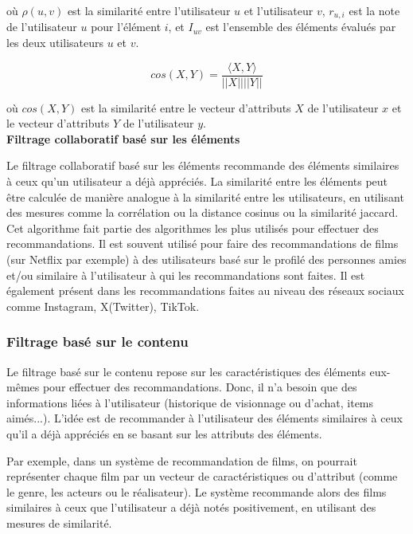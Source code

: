 \documentclass[11pt]{article}
\begin{document}
où $\rho(u, v)$ est la similarité entre l'utilisateur $u$ et l'utilisateur $v$, $r_{u,i}$ est la note de l'utilisateur $u$ pour l'élément $i$, et $I_{uv}$ est l'ensemble des éléments évalués par les deux utilisateurs $u$ et $v$.


\begin{equation}
cos(X, Y) = \frac{\langle X, Y \rangle}{||X|| ||Y||}
\end{equation}

où $cos(X, Y)$ est la similarité entre le vecteur d'attributs $X$ de l'utilisateur $x$ et le vecteur d'attributs $Y$ de l'utilisateur $y$.\\


\textbf{Filtrage collaboratif basé sur les éléments}

Le filtrage collaboratif basé sur les éléments recommande des éléments similaires à ceux qu'un utilisateur a déjà appréciés. La similarité entre les éléments peut être calculée de manière analogue à la similarité entre les utilisateurs, en utilisant des mesures comme la corrélation ou la distance cosinus ou la similarité jaccard.\\

Cet algorithme fait partie des algorithmes les plus utilisés pour effectuer des recommandations. Il est souvent utilisé pour faire des recommandations de films (sur Netflix par exemple) à des utilisateurs basé sur le profilé des personnes amies et/ou similaire à l'utilisateur à qui les recommandations sont faites. Il est également présent dans les recommandations faites au niveau des réseaux sociaux comme Instagram, X(Twitter), TikTok. \cite{anandhan2018social}

\subsubsection{Filtrage basé sur le contenu}
Le \cite{rolanda2023content} filtrage basé sur le contenu repose sur les caractéristiques des éléments eux-mêmes pour effectuer des recommandations. Donc, il n'a besoin que des informations liées à l'utilisateur (historique de visionnage ou d'achat, items aimés...). L'idée est de recommander à l'utilisateur des éléments similaires à ceux qu'il a déjà appréciés en se basant sur les attributs des éléments.

Par exemple, dans un système de recommandation de films, on pourrait représenter chaque film par un vecteur de caractéristiques ou d'attribut (comme le genre, les acteurs ou le réalisateur). Le système recommande alors des films similaires à ceux que l'utilisateur a déjà notés positivement, en utilisant des mesures de similarité.
\end{document}
